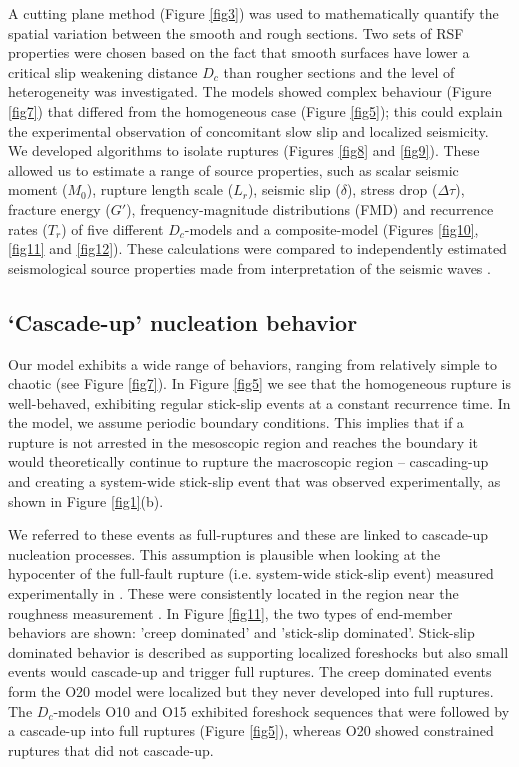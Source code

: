 \documentclass[preprint,1p, 10pt,authoryear]{elsarticle}
\begin{document}
A cutting plane method (Figure \ref{fig3}) was used to mathematically quantify the spatial variation between the smooth and rough sections. Two sets of RSF properties were chosen based on the fact that smooth surfaces have lower a critical slip weakening distance $D_{c}$ than rougher sections and the level of heterogeneity was investigated. The models showed complex behaviour (Figure \ref{fig7}) that differed from the homogeneous case (Figure \ref{fig5}); this could explain the experimental observation of concomitant slow slip and localized seismicity.  We developed algorithms to isolate ruptures (Figures \ref{fig8} and \ref{fig9}).  These allowed us to estimate a range of source properties, such as scalar seismic moment ($M_{0}$), rupture length scale ($L_{r}$), seismic slip ($\delta$), stress drop ($\Delta\tau$), fracture energy ($G'$), frequency-magnitude distributions (FMD) and recurrence rates ($T_{r}$) of five different $D_{c}$-models and a composite-model (Figures \ref{fig10}, \ref{fig11} and \ref{fig12}). These calculations were compared to independently estimated seismological source properties made from interpretation of the seismic waves \citep{Selvadurai2019}.

\subsection{`Cascade-up' nucleation behavior}
\label{Cascade_UP}
Our model exhibits a wide range of behaviors, ranging from relatively simple to chaotic (see Figure \ref{fig7}). In Figure \ref{fig5} we see that the homogeneous rupture is well-behaved, exhibiting regular stick-slip events at a constant recurrence time.  In the model, we assume periodic boundary conditions. This implies that if a rupture is not arrested in the mesoscopic region and reaches the boundary it would theoretically continue to rupture the macroscopic region -- cascading-up and creating a system-wide stick-slip event that was observed experimentally, as shown in Figure \ref{fig1}(b). 

We referred to these events as full-ruptures and these are linked to cascade-up nucleation processes. This assumption is plausible when looking at the hypocenter of the full-fault rupture (i.e. system-wide stick-slip event) measured experimentally in \citet{Selvadurai2015}. These were consistently located in the region near the roughness measurement \citep[magenta star in Fig. 7 and 8 in ][]{Selvadurai2015}. In Figure \ref{fig11}, the two types of end-member behaviors are shown: 'creep dominated' and 'stick-slip dominated'. Stick-slip dominated behavior is described as supporting localized foreshocks but also small events would cascade-up and trigger full ruptures. The creep dominated events form the O20 model were localized but they never developed into full ruptures. The $D_{c}$-models O10 and O15 exhibited foreshock sequences that were followed by a cascade-up into full ruptures (Figure \ref{fig5}), whereas O20 showed constrained ruptures that did not cascade-up. 
\end{document}

